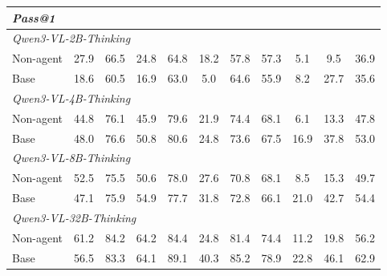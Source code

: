 \documentclass{llmxive}
\begin{document}
\begin{table}[t]
{\begin{tabular}{l ccc cccc cc >{\columncolor{mygray}}c}
        \multicolumn{11}{l}{\textit{Pass@1}} \\
        \midrule
        \multicolumn{11}{l}{\textit{Qwen3-VL-2B-Thinking}} \\
        Non-agent
            & 27.9 & 66.5 & 24.8 & 64.8 & 18.2 & 57.8 & 57.3 & 5.1 & 9.5 & 36.9 \\
        Base
            & 18.6 & 60.5 & 16.9 & 63.0 & 5.0 & 64.6 & 55.9 & 8.2 & 27.7 & 35.6 \\
        \midrule
        \multicolumn{11}{l}{\textit{Qwen3-VL-4B-Thinking}} \\
        Non-agent
            & 44.8 & 76.1 & 45.9 & 79.6 & 21.9 & 74.4 & 68.1 & 6.1 & 13.3 & 47.8 \\
        Base
            & 48.0 & 76.6 & 50.8 & 80.6 & 24.8 & 73.6 & 67.5 & 16.9 & 37.8 & 53.0 \\
        \midrule
        \multicolumn{11}{l}{\textit{Qwen3-VL-8B-Thinking}} \\
        Non-agent
            & 52.5 & 75.5 & 50.6 & 78.0 & 27.6 & 70.8 & 68.1 & 8.5 & 15.3 & 49.7 \\
        Base
            & 47.1 & 75.9 & 54.9 & 77.7 & 31.8 & 72.8 & 66.1 & 21.0 & 42.7 & 54.4 \\
        \midrule
        \multicolumn{11}{l}{\textit{Qwen3-VL-32B-Thinking}} \\
        Non-agent
            & 61.2 & 84.2 & 64.2 & 84.4 & 24.8 & 81.4 & 74.4 & 11.2 & 19.8 & 56.2 \\
        Base
            & 56.5 & 83.3 & 64.1 & 89.1 & 40.3 & 85.2 & 78.9 & 22.8 & 46.1 & 62.9 \\
        \midrule


\end{tabular}}
\end{table}
\end{document}
